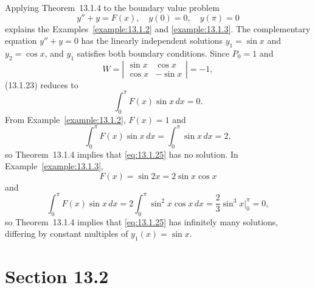 \setcounter{example}{6}
\setcounter{equation}{24}
\begin{example}
  \label{example:13.1.7} \rm Applying Theorem~13.1.4 to the boundary value problem
  \begin{equation}
    \label{eq:13.1.25}y''+y=F(x),\quad y(0)=0,\quad y(\pi)=0
  \end{equation}
  explains the Examples~\ref{example:13.1.2} and \ref{example:13.1.3}. The complementary equation
  $y''+y=0$ has the linearly independent solutions $y_{1}=\sin x$ and $y_{2}=\cos x$, and $y_{1}$
  satisfies both boundary conditions. Since $P_{0}=1$ and
  \[
    W= \left|
    \begin{array}{crccccc}
      \sin x & \cos x  \\
      \cos x & -\sin x
    \end{array}\right|=-1,
  \]
  \textup{(13.1.23)} reduces to
  \[
    \int_{0}^{\pi}F(x)\sin x\,dx=0.
  \]
  From Example~\ref{example:13.1.2}, $F(x)=1$ and
  \[
    \int_{0}^{\pi}F(x)\sin x\,dx=\int_{0}^{\pi}\sin x\,dx=2,
  \]
  so Theorem~13.1.4 implies that \eqref{eq:13.1.25} has no solution. In
  Example~\ref{example:13.1.3},
  \[
    F(x)=\sin2x=2\sin x\cos x
  \]
  and
  \[
    \int_{0}^{\pi}F(x)\sin x\,dx=2\int_{0}^{\pi}\sin^{2}x\cos x\,dx =\frac{2}{3}\sin^{3}x\bigg|_{0}^{\pi}=0,
  \]
  so Theorem~13.1.4 implies that \eqref{eq:13.1.25} has infinitely many solutions,
  differing by constant multiples of $y_{1}(x)=\sin x$.
\end{example}

\section*{Section 13.2}
\setcounter{chapter}{13}
\setcounter{section}{2}

